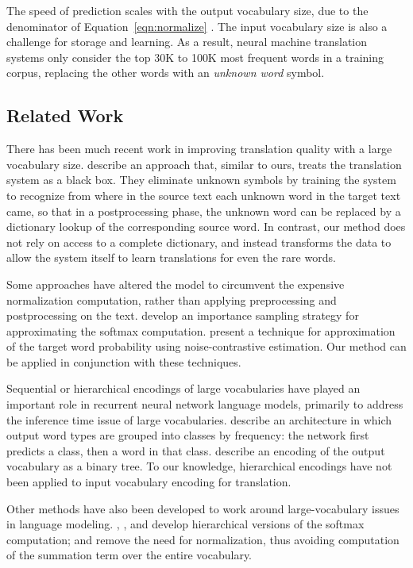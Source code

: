 The speed of prediction scales with the output vocabulary size, due to the
denominator of Equation~\ref{eqn:normalize} \cite{journals/corr/JeanCMB14}. The
input vocabulary size is also a challenge for storage and learning. As a
result, neural machine translation systems only consider the top 30K to 100K
most frequent words in a training corpus, replacing the other words with an
\emph{unknown word} symbol.

\subsection{Related Work}
There has been much recent work in improving translation quality with a large
vocabulary size.  describe an approach that,
similar to ours, treats the translation system as a black box. They eliminate
unknown symbols by training the system to recognize from where in the source
text each unknown word in the target text came, so that in a postprocessing
phase, the unknown word can be replaced by a dictionary lookup of the
corresponding source word. In contrast, our method does not rely on access to a
complete dictionary, and instead transforms the data to allow the system itself
to learn translations for even the rare words.

Some approaches have altered the model to circumvent the expensive
normalization computation, rather than applying preprocessing and
postprocessing on the text.  develop an
importance sampling strategy for approximating the softmax computation.
 present a technique for approximation of the target
word probability using noise-contrastive estimation. Our method can be applied
in conjunction with these techniques.

Sequential or hierarchical encodings of large vocabularies have played an
important role in recurrent neural network language models, primarily to
address the inference time issue of large vocabularies. 
describe an architecture in which output word types are grouped into classes by
frequency: the network first predicts a class, then a word in that
class.  describe an encoding of the output
vocabulary as a binary tree. To our knowledge, hierarchical encodings have not
been applied to input vocabulary encoding for translation.

Other methods have also been developed to work around large-vocabulary issues
in language modeling. ,
, and  develop hierarchical versions
of the softmax computation;  and
 remove the need for normalization,
thus avoiding computation of the summation term over the entire vocabulary.

